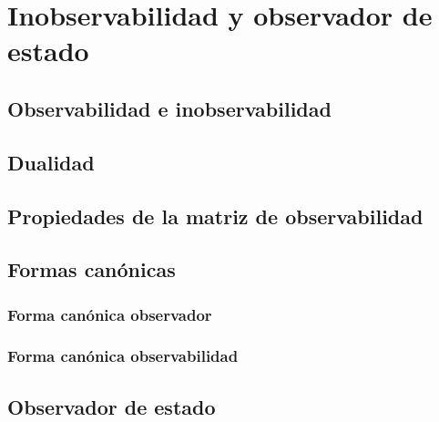 
\chapter{Inobservabilidad y observador de estado}
    \section{Observabilidad e inobservabilidad}
    \section{Dualidad}
    \section{Propiedades de la matriz de observabilidad}
    \section{Formas canónicas}
        \subsection{Forma canónica observador}
        \subsection{Forma canónica observabilidad}
    \section{Observador de estado}
